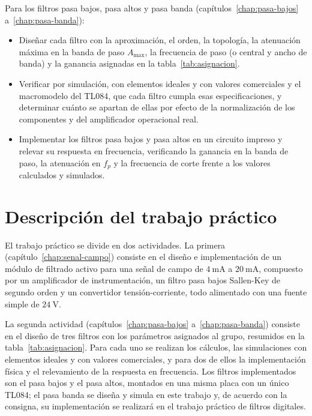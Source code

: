 Para los filtros pasa bajos, pasa altos y pasa banda (capítulos~\ref{chap:pasa-bajos} a~\ref{chap:pasa-banda}):
\begin{itemize}
  \item Diseñar cada filtro con la aproximación, el orden, la topología, la atenuación máxima en la banda de paso
    $A_{\max}$, la frecuencia de paso (o central y ancho de banda) y la ganancia asignadas en la
    tabla~\ref{tab:asignacion}.
  \item Verificar por simulación, con elementos ideales y con valores comerciales y el macromodelo del TL084, que
    cada filtro cumpla esas especificaciones, y determinar cuánto se apartan de ellas por efecto de la normalización
    de los componentes y del amplificador operacional real.
  \item Implementar los filtros pasa bajos y pasa altos en un circuito impreso y relevar su respuesta en frecuencia,
    verificando la ganancia en la banda de paso, la atenuación en $f_p$ y la frecuencia de corte frente a los valores
    calculados y simulados.
\end{itemize}

\section{Descripción del trabajo práctico}
\label{sec:descripcion}

El trabajo práctico se divide en dos actividades. La primera (capítulo~\ref{chap:senal-campo}) consiste en el diseño
e implementación de un módulo de filtrado activo para una señal de campo de $\SI{4}{\milli\ampere}$ a
$\SI{20}{\milli\ampere}$, compuesto por un amplificador de instrumentación, un filtro pasa bajos Sallen-Key de
segundo orden y un convertidor tensión-corriente, todo alimentado con una fuente simple de $\SI{24}{\volt}$.

La segunda actividad (capítulos~\ref{chap:pasa-bajos} a~\ref{chap:pasa-banda}) consiste en el diseño de tres filtros
con los parámetros asignados al grupo, resumidos en la tabla~\ref{tab:asignacion}. Para cada uno se realizan los
cálculos, las simulaciones con elementos ideales y con valores comerciales, y para dos de ellos la implementación
física y el relevamiento de la respuesta en frecuencia. Los filtros implementados son el pasa bajos y el pasa altos,
montados en una misma placa con un único TL084; el pasa banda se diseña y simula en este trabajo y, de acuerdo con la
consigna, su implementación se realizará en el trabajo práctico de filtros digitales.

